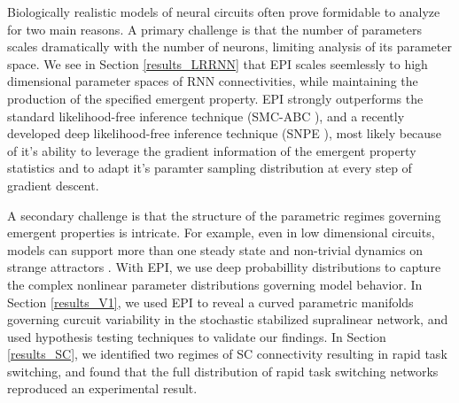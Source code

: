 \documentclass[11pt]{article}
\begin{document}

Biologically realistic models of neural circuits often prove formidable to analyze for two main reasons.
A primary challenge is that the number of parameters scales dramatically with the number of neurons, limiting analysis of its parameter space.
We see in Section \ref{results_LRRNN} that EPI scales seemlessly to high dimensional parameter spaces of RNN connectivities, while maintaining the production of the specified emergent property.
EPI strongly outperforms the standard likelihood-free inference technique (SMC-ABC \cite{sisson2007sequential}), and a recently developed deep likelihood-free inference technique (SNPE \cite{gonccalves2019training}), most likely because of it's ability to leverage the gradient information of the emergent property statistics and to adapt it's paramter sampling distribution at every step of gradient descent.

A secondary challenge is that the structure of the parametric regimes governing emergent properties is intricate.  
For example, even in low dimensional circuits, models can support more than one steady state \cite{kraynyukova2018stabilized} and non-trivial dynamics on strange attractors \cite{morrison2016diversity}.
With EPI, we use deep probabillity distributions to capture the complex nonlinear parameter distributions governing model behavior.
In Section \ref{results_V1}, we used EPI to reveal a curved parametric manifolds governing curcuit variability in the stochastic stabilized supralinear network, and used hypothesis testing techniques to validate our findings.
In Section \ref{results_SC}, we identified two regimes of SC connectivity resulting in rapid task switching, and found that the full distribution of rapid task switching networks reproduced an experimental result.
\end{document}
